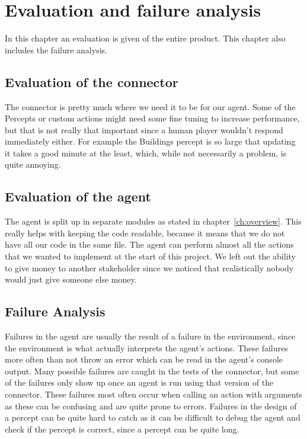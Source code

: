 \chapter{Evaluation and failure analysis}
In this chapter an evaluation is given of the entire product. This chapter also includes the failure analysis. 

\section{Evaluation of the connector}
The connector is pretty much where we need it to be for our agent.
Some of the Percepts or custom actions might need some fine tuning to increase performance, but that is not really that important since a human player wouldn't respond immediately either.
For example the Buildings percept is so large that updating it takes a good minute at the least, which, while not necessarily a problem, is quite annoying.



\section{Evaluation of the agent}
The agent is split up in separate modules as stated in chapter~\ref{ch:overview}.
This really helps with keeping the code readable, because it means that we do not have all our code in the same file.
The agent can perform almost all the actions that we wanted to implement at the start of this project.
We left out the ability to give money to another stakeholder since we noticed that realistically nobody would just give someone else money.

\section{Failure Analysis}
Failures in the agent are usually the result of a failure in the environment, since the environment is what actually interprets the agent's actions.
These failures more often than not throw an error which can be read in the agent's console output.
Many possible failures are caught in the tests of the connector, but some of the failures only show up once an agent is run using that version of the connector.
These failures most often occur when calling an action with arguments as these can be confusing and are quite prone to errors.
Failures in the design of a percept can be quite hard to catch as it can be difficult to debug the agent and check if the percept is correct, since a percept can be quite long.
